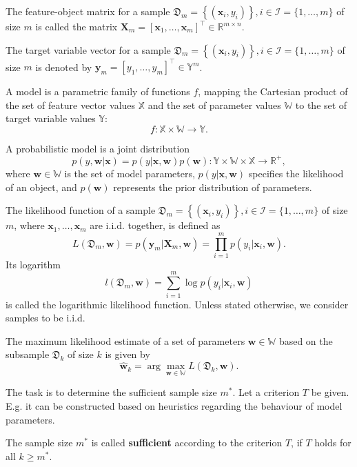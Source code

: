 \documentclass[runningheads]{llncs}
\begin{document}
The feature-object matrix for a sample $\mathfrak{D}_m = \left\{ (\mathbf{x}_i, y_i) \right\}, i \in \mathcal{I} = \{ 1, \ldots, m \}$ of size $m$ is called the matrix $\mathbf{X}_m = \left[ \mathbf{x}_1, \ldots, \mathbf{x}_m \right]^{\top} \in \mathbb{R}^{m \times n}$.

The target variable vector for a sample $\mathfrak{D}_m = \left\{ (\mathbf{x}_i, y_i) \right\}, i \in \mathcal{I} = \{ 1, \ldots, m \}$ of size $m$ is denoted by $\mathbf{y}_m = \left[ y_1, \ldots, y_m \right]^{\top} \in \mathbb{Y}^m$.

A model is a parametric family of functions $f$, mapping the Cartesian product of the set of feature vector values $\mathbb{X}$ and the set of parameter values $\mathbb{W}$ to the set of target variable values $\mathbb{Y}$: 
\[ f: \mathbb{X} \times \mathbb{W} \to \mathbb{Y}. \]

A probabilistic model is a joint distribution
\[ p(y, \mathbf{w} | \mathbf{x}) = p(y | \mathbf{x}, \mathbf{w}) p(\mathbf{w}): \mathbb{Y} \times \mathbb{W} \times \mathbb{X} \to \mathbb{R}^+, \]
where $\mathbf{w} \in \mathbb{W}$ is the set of model parameters, $p(y | \mathbf{x}, \mathbf{w})$ specifies the likelihood of an object, and $p(\mathbf{w})$ represents the prior distribution of parameters.

The likelihood function of a sample $\mathfrak{D}_m = \left\{ (\mathbf{x}_i, y_i) \right\}, i \in \mathcal{I} = \{ 1, \ldots, m \}$ of size $m$, where $\mathbf{x}_1, \ldots, \mathbf{x}_m$ are i.i.d. together, is defined as 
\[ L(\mathfrak{D}_m, \mathbf{w}) = p(\mathbf{y}_m | \mathbf{X}_m, \mathbf{w}) = \prod_{i=1}^{m} p(y_i | \mathbf{x}_i, \mathbf{w}). \]
Its logarithm
\[ l(\mathfrak{D}_m, \mathbf{w}) = \sum\limits_{i=1}^{m} \log p(y_i | \mathbf{x}_i, \mathbf{w}) \]
is called the logarithmic likelihood function. Unless stated otherwise, we consider samples to be i.i.d.

The maximum likelihood estimate of a set of parameters $\mathbf{w} \in \mathbb{W}$ based on the subsample $\mathfrak{D}_k$ of size $k$ is given by 
\[ \hat{\mathbf{w}}_{k} = \arg\max_{\mathbf{w} \in \mathbb{W}} L(\mathfrak{D}_k, \mathbf{w}). \]

The task is to determine the sufficient sample size $m^*$. Let a criterion $T$ be given. E.g. it can be constructed based on heuristics regarding the behaviour of model parameters.
\begin{definition}
    The sample size $m^*$ is called \textbf{sufficient} according to the criterion $T$, if $T$ holds for all $k \geqslant m^*$.
\end{definition}
\end{document}
